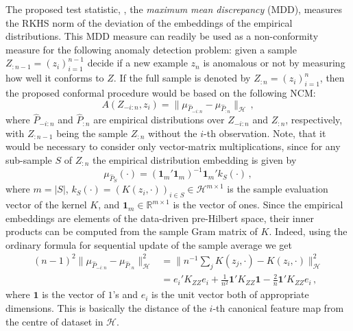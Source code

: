 \documentclass[a4paper,14pt]{extarticle}
\newcommand{\Hcal}{\mathcal{H}}
\newcommand{\Real}{\mathbb{R}}
\newcommand{\one}{\mathbf{1}}
\begin{document}
The proposed test statistic, \cite{gretton2012}, the \textit{maximum mean discrepancy}
(MDD), measures the RKHS norm of the deviation of the embeddings of the empirical
distributions. This MDD measure can readily be used as a non-conformity measure
for the following anomaly detection problem: given a sample $Z_{:n-1} = (z_i)_{i=1}^{n-1}$
decide if a new example $z_n$ is anomalous or not by measuring how well it conforms
to $Z$. If the full sample is denoted by $Z_{:n} = (z_i)_{i=1}^n$, then the proposed
conformal procedure would be based on the following NCM:
\begin{equation*}
  A(Z_{-i:n}, z_i) = \| \mu_{\hat{P}_{-i:n}} - \mu_{\hat{P}_{:n}} \|_{\Hcal} \,,
\end{equation*}
where $\hat{P}_{-i:n}$ and $\hat{P}_{:n}$ are empirical distributions over $Z_{-i:n}$
and $Z_{:n}$, respectively, with $Z_{:n-1}$ being the sample $Z_{:n}$ without the
$i$-th observation. Note, that it would be necessary to consider only vector-matrix
multiplications, since for any sub-sample $S$ of $Z_{:n}$ the empirical distribution
embedding is given by
\begin{equation*}
  \mu_{\hat{P}_S}(\cdot) = (\one_m'\one_m)^{-1} \one_m' k_S(\cdot) \,,
\end{equation*}
where $m = |S|$, $k_S(\cdot) = (K(z_i, \cdot))_{i\in S} \in \Hcal^{m\times 1}$ is
the sample evaluation vector of the kernel $K$, and $\one_m \in \Real^{m\times 1}$
is the vector of ones. Since the empirical embeddings are elements of the data-driven
pre-Hilbert space, their inner products can be computed from the sample Gram matrix
of $K$. Indeed, using the ordinary formula for sequential update of the sample average
we get
\begin{align*}
  (n-1)^2 \bigl\|\mu_{\hat{P}_{-i:n}} - \mu_{\hat{P}_{:n}} \bigr\|^2_\Hcal
    &= \bigl\| n^{-1} \sum_j K(z_j, \cdot) - K(z_i, \cdot) \bigr\|^2_\Hcal \\
    &= e_i'K_{ZZ} e_i + \frac{1}{n^2} \one' K_{ZZ} \one - \frac{2}{n} \one' K_{ZZ} e_i \,,
\end{align*}
where $\one$ is the vector of $1$'s and $e_i$ is the unit vector both of appropriate
dimensions. This is basically the distance of the $i$-th canonical feature map from
the centre of dataset in $\Hcal$.
\end{document}
